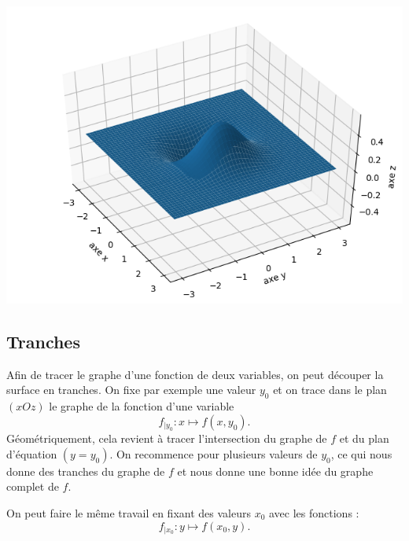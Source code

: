 \begin{exemple}{}{}
\begin{center}
		\includegraphics[scale=\myscale,scale=0.5]{figures/fonctions-surface-1d}
	\end{center}
	
\end{exemple}


\subsection{Tranches}

Afin de tracer le graphe d'une fonction de deux variables, on peut découper la surface en \og{}tranches\fg{}.
On fixe par exemple une valeur $y_0$ et on trace dans le plan $(xOz)$ le graphe de la fonction d'une variable  
$$f_{|y_0} : x\mapsto f(x,y_0).$$
Géométriquement, cela revient à tracer l'intersection du graphe de $f$ et du plan d'équation $(y=y_0)$.
On recommence pour plusieurs valeurs de $y_0$, ce qui nous donne des tranches du graphe de $f$ et nous donne une bonne idée du graphe complet de $f$.

On peut faire le même travail en fixant des valeurs $x_0$ avec les fonctions :
$$f_{|x_0} : y \mapsto f(x_0,y).$$


